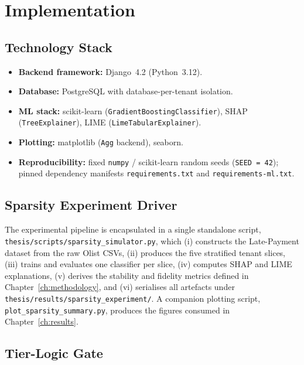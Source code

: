 \chapter{Implementation}
\label{ch:implementation}

\section{Technology Stack}
\label{sec:impl_stack}

\begin{itemize}
  \item \textbf{Backend framework:} Django~4.2 (Python~3.12).
  \item \textbf{Database:} PostgreSQL with database-per-tenant isolation.
  \item \textbf{ML stack:} scikit-learn (\texttt{GradientBoostingClassifier}), SHAP (\texttt{TreeExplainer}), LIME (\texttt{LimeTabularExplainer}).
  \item \textbf{Plotting:} matplotlib (\texttt{Agg} backend), seaborn.
  \item \textbf{Reproducibility:} fixed \texttt{numpy} / scikit-learn random seeds (\texttt{SEED~=~42}); pinned dependency manifests \texttt{requirements.txt} and \texttt{requirements-ml.txt}.
\end{itemize}

\section{Sparsity Experiment Driver}
\label{sec:impl_experiment}

The experimental pipeline is encapsulated in a single standalone script, \texttt{thesis/scripts/sparsity\_simulator.py}, which (i) constructs the Late-Payment dataset from the raw Olist CSVs, (ii) produces the five stratified tenant slices, (iii) trains and evaluates one classifier per slice, (iv) computes SHAP and LIME explanations, (v) derives the stability and fidelity metrics defined in Chapter~\ref{ch:methodology}, and (vi) serialises all artefacts under \texttt{thesis/results/sparsity\_experiment/}. A companion plotting script, \texttt{plot\_sparsity\_summary.py}, produces the figures consumed in Chapter~\ref{ch:results}.

\section{Tier-Logic Gate}
\label{sec:impl_tier_gate}

